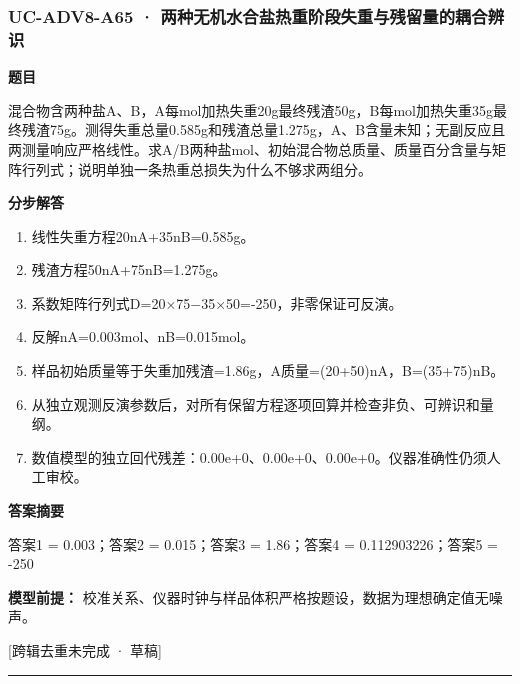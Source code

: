 \documentclass[UTF8,11pt,a4paper]{ctexart}
\begin{document}
\subsubsection*{UC-ADV8-A65 · 两种无机水合盐热重阶段失重与残留量的耦合辨识}
\noindent\textbf{题目}\par
混合物含两种盐A、B，A每mol加热失重20g最终残渣50g，B每mol加热失重35g最终残渣75g。测得失重总量0.585g和残渣总量1.275g，A、B含量未知；无副反应且两测量响应严格线性。求A/B两种盐mol、初始混合物总质量、质量百分含量与矩阵行列式；说明单独一条热重总损失为什么不够求两组分。\par
\medskip\noindent\textbf{分步解答}
\begin{enumerate}
\item 线性失重方程20nA+35nB=0.585g。
\item 残渣方程50nA+75nB=1.275g。
\item 系数矩阵行列式D=20×75−35×50=-250，非零保证可反演。
\item 反解nA=0.003mol、nB=0.015mol。
\item 样品初始质量等于失重加残渣=1.86g，A质量=(20+50)nA，B=(35+75)nB。
\item 从独立观测反演参数后，对所有保留方程逐项回算并检查非负、可辨识和量纲。
\item 数值模型的独立回代残差：0.00e+0、0.00e+0、0.00e+0。仪器准确性仍须人工审校。
\end{enumerate}
\noindent\textbf{答案摘要}\par
答案1 = 0.003；答案2 = 0.015；答案3 = 1.86；答案4 = 0.112903226；答案5 = -250\par
\noindent\textbf{模型前提：}
校准关系、仪器时钟与样品体积严格按题设，数据为理想确定值无噪声。\par
\noindent\textcolor{red!65!black}{[跨辑去重未完成 · 草稿]} \par
\medskip\hrule\medskip
{}
\end{document}
